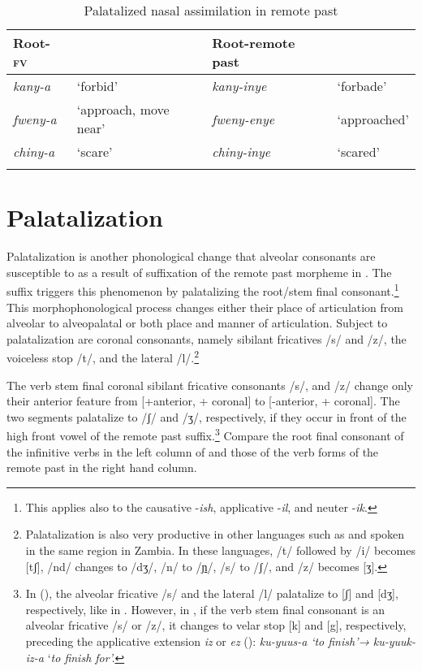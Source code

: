 \documentclass[output=paper]{langsci/langscibook}
\begin{document}
\begin{table}
\begin{tabularx}{\textwidth}{XllX}
\lsptoprule
Root-\textsc{fv} &  & Root-remote past & \\
\midrule 
\textit{kany-a} & `forbid' & \textit{kany-inye} & `forbade' \\
\textit{fweny-a} & `approach, move near' & \textit{fweny-enye} & `approached' \\
\textit{chiny-a} & `scare' & \textit{chiny-inye} & `scared' \\

\lspbottomrule
\end{tabularx}

\caption{Palatalized nasal assimilation in remote past}
\label{tab:8.kawasha}

 \end{table}


\section{Palatalization} \label{§3:palatalization.kawasha}

Palatalization is another phonological change that alveolar consonants are susceptible to as a result of suffixation of the remote past morpheme in . The suffix triggers this phenomenon by palatalizing the root/stem final consonant.\footnote{This applies also to the causative -\textit{ish}, applicative -\textit{il}, and neuter -\textit{ik}.} This morphophonological process changes either their place of articulation from alveolar to alveopalatal or both place and manner of articulation. Subject to palatalization are coronal consonants, namely sibilant fricatives /s/ and /z/, the voiceless stop /t/, and the lateral /l/.\footnote{Palatalization is also very productive in other languages such as  and  spoken in the same region in  Zambia. In these languages, /t/ followed by /i/ becomes [tʃ], /nd/ changes to /dʒ/, /n/ to /\href{http://en.wikipedia.org/wiki/Ɲ}{ɲ}/, /s/ to /ʃ/, and /z/ becomes [ʒ].} 

The verb stem final coronal sibilant fricative consonants /s/, and /z/ change only their anterior feature from [+anterior, + coronal] to [-anterior, + coronal]. The two segments palatalize to /ʃ/ and /ʒ/, respectively, if they occur in front of the high front vowel of the remote past suffix.\footnote{In  (\citealt{magangaschadeberg1992}), the alveolar fricative /s/ and the lateral /l/ palatalize to [ʃ] and [dʒ], respectively, like in . However, in , if the verb stem final consonant is an alveolar fricative /s/ or /z/, it changes to velar stop [k] and [g], respectively, preceding the applicative extension \textit{iz} or \textit{ez} (\citealt{bashi2008}): \textit{ku-yuus-a }\textit{\textup{‘to finish’}}\textit{\textup{→}} \textit{ku-yuuk-iz-a} ‘\textit{\textup{to finish for’.}}} Compare the root final consonant of the infinitive verbs in the left column of  and those of the verb forms of the remote past in the right hand column.
\end{document}
